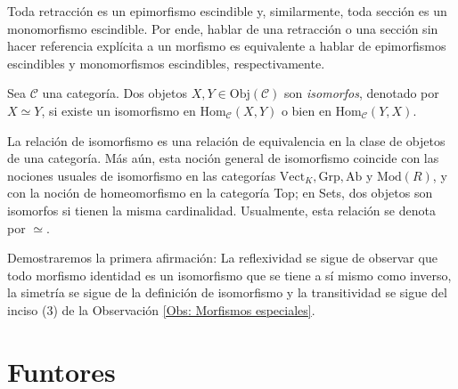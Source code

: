 \documentclass[tesis]{subfiles}
\begin{document}
\begin{Obs}\label{Obs: retracción y sección}
    Toda retracción es un epimorfismo escindible y, similarmente, toda sección es un monomorfismo escindible. Por ende, hablar de una retracción o una sección sin hacer referencia explícita a un morfismo es equivalente a hablar de epimorfismos escindibles y monomorfismos escindibles, respectivamente.
\end{Obs}

\begin{Def}\label{Def: Relación de isomorfismo}
    Sea $\mathscr{C}$ una categoría. Dos objetos $X,Y\in\text{Obj}(\mathscr{C})$ son \emph{isomorfos}, denotado por $X\simeq Y$, si existe un isomorfismo en $\text{Hom}_\mathscr{C}(X,Y)$ o bien en $\text{Hom}_\mathscr{C}(Y,X)$.
\end{Def}

\begin{Obs}\label{Observaciones sobre la relación de isomorfismo}
    La relación de isomorfismo es una relación de equivalencia en la clase de objetos de una categoría. Más aún, esta noción general de isomorfismo coincide con las nociones usuales de isomorfismo en las categorías $\text{Vect}_K, \text{Grp}, \text{Ab}$ y $\text{Mod}(R)$, y con la noción de homeomorfismo en la categoría Top; en Sets, dos objetos son isomorfos si tienen la misma cardinalidad. Usualmente, esta relación se denota por $\simeq$.

    \vspace{1mm}
    \noindent Demostraremos la primera afirmación: La reflexividad se sigue de observar que todo morfismo identidad es un isomorfismo que se tiene a sí mismo como inverso, la simetría se sigue de la definición de isomorfismo y la transitividad se sigue del inciso (3) de la Observación \ref{Obs: Morfismos especiales}.
\end{Obs}

\section{Funtores} \label{Sec: Funtores}
\end{document}
